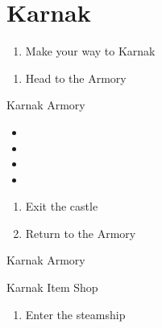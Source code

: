 \chapter{Karnak}

\vspace{\baselineskip}

\begin{paracol}{2}

\begin{enumerate}
    \item Make your way to Karnak
\end{enumerate}

\resume
\begin{enumerate}[resume]
    \item Head to the Armory
\end{enumerate}

\begin{shop}{Karnak Armory}
    \varwb
    \begin{sell}
        \item {}
        \begin{itemize}
            \item \tent
            \item \knife
            \item \phoenixDown
            \item \potion
        \end{itemize}
    \end{sell}
    \begin{buy}
        \item {} \iceRod \space {}
    \end{buy}
    \varwe
\end{shop}

\begin{enumerate}[resume]
    \item Exit the castle
    \item Return to the Armory
\end{enumerate}

\switchcolumnTwice[*]
\begin{shop}{Karnak Armory}
    \varwb
    \begin{buy}
        \item {} \iceRod \space {}
    \end{buy}
    \varwe
\end{shop}

\switchcolumn
\begin{steproute}{Karnak Item Shop}
    \varwb
    \begin{buy}
        \item {} \antidote \space {}
    \end{buy}
    \varwe
\end{steproute}

\switchcolumn
\begin{enumerate}[resume]
    \item Enter the steamship
\end{enumerate}

\end{paracol}